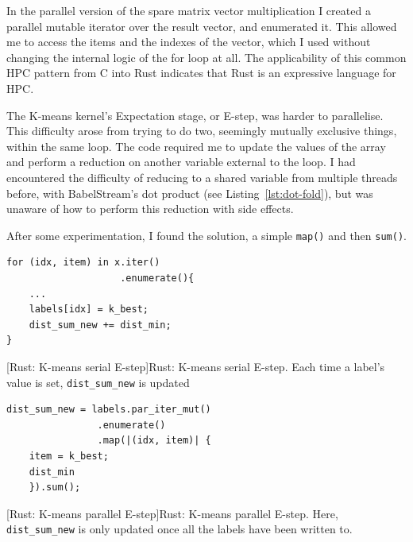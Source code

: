 In the parallel version of the spare matrix vector multiplication I created a parallel mutable iterator over the result vector, and enumerated it. This allowed me to access the items and the indexes of the vector, which I used without changing the internal logic of the for loop at all. The applicability of this common HPC pattern from C into Rust indicates that Rust is an expressive language for HPC.

The K-means kernel's Expectation stage, or E-step, was harder to parallelise. This difficulty arose from trying to do two, seemingly mutually exclusive things, within the same loop. The code required me to update the values of the array and perform a reduction on another variable external to the loop. I had encountered the difficulty of reducing to a shared variable from multiple threads before, with BabelStream's dot product (see Listing~\ref{lst:dot-fold}), but was unaware of how to perform this reduction with side effects.

After some experimentation, I found the solution, a simple \texttt{map()} and then \texttt{sum()}. 

\begin{minipage}{.49\textwidth}
\begin{code}
\begin{verbatim}
for (idx, item) in x.iter()
                    .enumerate(){
    ...
    labels[idx] = k_best;
    dist_sum_new += dist_min;
}
\end{verbatim}
[Rust: K-means serial E-step]{Rust: K-means serial E-step. Each time a label's value is set, \texttt{dist\_sum\_new} is updated}
\label{lst:kmeansserial}
\end{code}
\end{minipage}\hfill
\begin{minipage}{.49\textwidth}
\begin{code}
\begin{verbatim}
dist_sum_new = labels.par_iter_mut()
                .enumerate()
                .map(|(idx, item)| {
    item = k_best;
    dist_min
    }).sum();
\end{verbatim}
[Rust: K-means parallel E-step]{Rust: K-means parallel E-step. Here, \texttt{dist\_sum\_new} is only updated once all the labels have been written to.}
\label{lst:kmeanspar}
\end{code}
\end{minipage}


